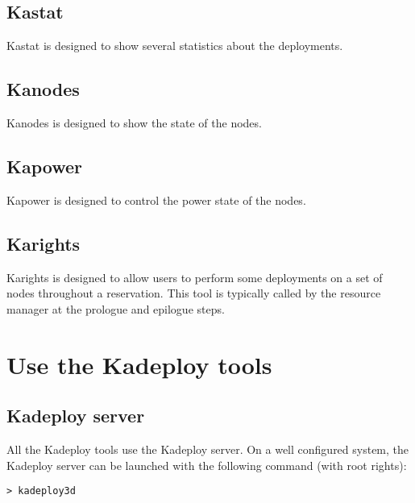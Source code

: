 \documentclass[a4wide,10pt,oneside]{book}
\begin{document}
\subsection{Kastat}
Kastat is designed to show several statistics about the deployments.

\subsection{Kanodes}
Kanodes is designed to show the state of the nodes.

\subsection{Kapower}
Kapower is designed to control the power state of the nodes.

\subsection{Karights}
Karights is designed to allow users to perform some deployments on a set of nodes throughout a reservation. This tool is typically called by the resource manager at the prologue and epilogue steps.

\section{Use the Kadeploy tools}
\subsection{Kadeploy server}
All the Kadeploy tools use the Kadeploy server. On a well configured system, the Kadeploy server can be launched with the following command (with root rights):
\begin{verbatim}
> kadeploy3d
\end{verbatim}
\end{document}
